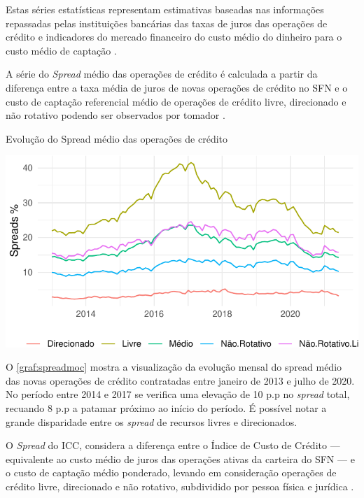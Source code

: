 \documentclass[
  12pt,
  12pt,
  openright,
  oneside,
  a4paper,
  chapter=TITLE,
  section=TITLE,
  subsection=TITLE,
  subsubsection=TITLE,
  english,
  portugues,
  sumario=tradicional]{abntex2}
\begin{document}
Estas séries estatísticas representam estimativas baseadas nas informações repassadas pelas instituições bancárias das taxas de juros das operações de crédito e indicadores do mercado financeiro do custo médio do dinheiro para o custo médio de captação \cite{BCB:2016}.

A série do \emph{Spread} médio das operações de crédito é calculada a partir da diferença entre a taxa média de juros de novas operações de crédito no SFN e o custo de captação referencial médio de operações de crédito livre, direcionado e não rotativo podendo ser observados por tomador \cite{BCB:2016}.

\begin{grafico}[!htbp]
\vspace{20pt}
\caption{Evolução do Spread médio das operações de crédito}
\vspace{-4mm}

\begin{center}\includegraphics{12-exportedfigures/spread.2019.moc-1} \end{center}
\vspace{-3mm}
\label{graf:spreadmoc}
\vspace{-2mm}
\end{grafico}

O \autoref{graf:spreadmoc} mostra a visualização da evolução mensal do spread médio das novas operações de crédito contratadas entre janeiro de 2013 e julho de 2020. No período entre 2014 e 2017 se verifica uma elevação de 10 p.p no \emph{spread} total, recuando 8 p.p a patamar próximo ao início do período. É possível notar a grande disparidade entre os \emph{spread} de recursos livres e direcionados.

O \emph{Spread} do ICC, considera a diferença entre o Índice de Custo de Crédito --- equivalente ao custo médio de juros das operações ativas da carteira do SFN --- e o custo de captação médio ponderado, levando em consideração operações de crédito livre, direcionado e não rotativo, subdividido por pessoa física e jurídica \cite{BCB:2016}.
\end{document}
